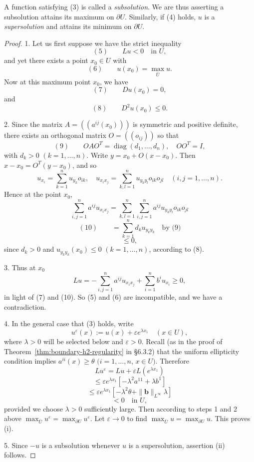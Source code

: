 \begin{remark}
\label{rem:subsolution-supersolution-terminology}
A function satisfying (3) is called a \textit{subsolution}. We are thus asserting a subsolution attains its maximum on $\partial U$. Similarly, if (4) holds, $u$ is a \textit{supersolution} and attains its minimum on $\partial U$.
\end{remark}

\begin{proof}
1. Let us first suppose we have the strict inequality
$$(5) \qquad Lu < 0 \quad \text{in } U,$$
and yet there exists a point $x_0 \in U$ with
$$(6) \qquad u(x_0) = \max_{\bar U} u.$$
Now at this maximum point $x_0$, we have
$$(7) \qquad Du(x_0) = 0,$$
and
$$(8) \qquad D^2u(x_0) \leq 0.$$

2. Since the matrix $A = ((a^{ij}(x_0)))$ is symmetric and positive definite, there exists an orthogonal matrix $O = ((o_{ij}))$ so that
$$(9) \qquad OAO^T = \operatorname{diag}(d_1,\ldots,d_n), \quad OO^T = I,$$
with $d_k > 0$ $(k=1,\ldots,n)$. Write $y = x_0 + O(x-x_0)$. Then $x - x_0 = O^T(y-x_0)$, and so
$$u_{x_i} = \sum_{k=1}^n u_{y_k}o_{ik}, \quad u_{x_ix_j} = \sum_{k,l=1}^n u_{y_ky_l}o_{ik}o_{jl} \quad (i,j=1,\ldots,n).$$
Hence at the point $x_0$,
$$\sum_{i,j=1}^n a^{ij}u_{x_ix_j} = \sum_{k,l=1}^n \sum_{i,j=1}^n a^{ij}u_{y_ky_l}o_{ik}o_{jl}$$
$$(10) \qquad = \sum_{k=1}^n d_ku_{y_ky_k} \quad \text{by (9)}$$
$$\leq 0,$$
since $d_k > 0$ and $u_{y_ky_k}(x_0) \leq 0$ $(k=1,\ldots,n)$, according to (8).

3. Thus at $x_0$
$$Lu = -\sum_{i,j=1}^n a^{ij}u_{x_ix_j} + \sum_{i=1}^n b^iu_{x_i} \geq 0,$$
in light of (7) and (10). So (5) and (6) are incompatible, and we have a contradiction.

4. In the general case that (3) holds, write
$$u^\varepsilon(x) := u(x) + \varepsilon e^{\lambda x_1} \quad (x \in U),$$
where $\lambda > 0$ will be selected below and $\varepsilon > 0$. Recall (as in the proof of Theorem~\ref{thm:boundary-h2-regularity} in \S6.3.2) that the uniform ellipticity condition implies $a^{ii}(x) \geq \theta$ $(i=1,\ldots,n$, $x \in U)$. Therefore
$$Lu^\varepsilon = Lu + \varepsilon L(e^{\lambda x_1})$$
$$\leq \varepsilon e^{\lambda x_1}[-\lambda^2a^{11} + \lambda b^1]$$
$$\leq \varepsilon e^{\lambda x_1}[-\lambda^2\theta + \|\mathbf b\|_{L^\infty}\lambda]$$
$$< 0 \quad \text{in } U,$$
provided we choose $\lambda > 0$ sufficiently large. Then according to steps 1 and 2 above $\max_{\bar U} u^\varepsilon = \max_{\partial U} u^\varepsilon$. Let $\varepsilon \to 0$ to find $\max_{\bar U} u = \max_{\partial U} u$. This proves (i).

5. Since $-u$ is a subsolution whenever $u$ is a supersolution, assertion (ii) follows.
\end{proof}

